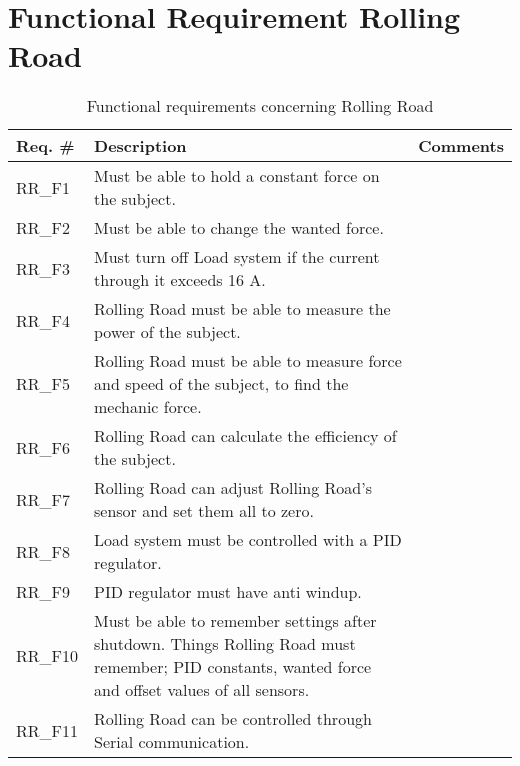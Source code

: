 \section{Functional Requirement Rolling Road}

\begin{table}[h!]
	\label{FREQ_AU2}
	\centering
	\begin{tabular}{|p{2 cm}|p{10 cm}|p{2 cm}|}
		\hline
		\textbf{Req. \#} & \textbf{Description} & \textbf{Comments} \\\hline
		RR\_F1
		& Must be able to hold a constant force on the subject.
		&  \\ \hline
		RR\_F2
		& Must be able to change the wanted force. 
		&  \\ \hline
		RR\_F3
		& Must turn off Load system if the current through it exceeds 16 A.
		&  \\ \hline
		RR\_F4
		& Rolling Road must be able to measure the power of the subject.
		&  \\ \hline
		RR\_F5
		& Rolling Road must be able to measure force and speed of the subject, to find the mechanic force.
		&  \\ \hline
		RR\_F6
		& Rolling Road can calculate the efficiency of the subject. 
		&  \\ \hline
		RR\_F7
		& Rolling Road can adjust Rolling Road's sensor and set them all to zero. 
		&  \\ \hline
		RR\_F8
		& Load system must be controlled with a PID regulator.
		&  \\ \hline
		RR\_F9
		& PID regulator must have anti windup.
		&  \\ \hline
		RR\_F10
		& Must be able to remember settings after shutdown. Things Rolling Road must remember; PID constants, wanted force and offset values of all sensors.
		&  \\ \hline
		RR\_F11
		& Rolling Road can be controlled through Serial communication.  
		&  \\ \hline
	\end{tabular}
	\caption{Functional requirements concerning Rolling Road}
\end{table}
